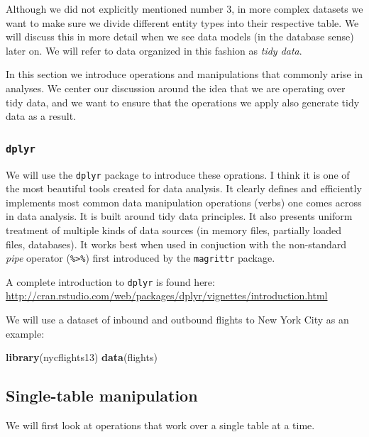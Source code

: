 \documentclass[]{article}
\newenvironment{Shaded}{\begin{snugshade}}{\end{snugshade}}
\newcommand{\KeywordTok}[1]{\textcolor[rgb]{0.13,0.29,0.53}{\textbf{{#1}}}}
\newcommand{\NormalTok}[1]{{#1}}
\theoremstyle{definition}
\theoremstyle{definition}
\theoremstyle{remark}
\begin{document}
Although we did not explicitly mentioned number 3, in more complex
datasets we want to make sure we divide different entity types into
their respective table. We will discuss this in more detail when we see
data models (in the database sense) later on. We will refer to data
organized in this fashion as \emph{tidy data}.

In this section we introduce operations and manipulations that commonly
arise in analyses. We center our discussion around the idea that we are
operating over tidy data, and we want to ensure that the operations we
apply also generate tidy data as a result.

\subsubsection{\texorpdfstring{\texttt{dplyr}}{dplyr}}\label{dplyr}

We will use the \texttt{dplyr} package to introduce these oprations. I
think it is one of the most beautiful tools created for data analysis.
It clearly defines and efficiently implements most common data
manipulation operations (verbs) one comes across in data analysis. It is
built around tidy data principles. It also presents uniform treatment of
multiple kinds of data sources (in memory files, partially loaded files,
databases). It works best when used in conjuction with the non-standard
\emph{pipe} operator (\texttt{\%\textgreater{}\%}) first introduced by
the \texttt{magrittr} package.

A complete introduction to \texttt{dplyr} is found here:
\href{http://cran.rstudio.com/web/packages/dplyr/vignettes/introduction.html}{\url{http://cran.rstudio.com/web/packages/dplyr/vignettes/introduction.html}}

We will use a dataset of inbound and outbound flights to New York City
as an example:

\begin{Shaded}
\begin{Highlighting}[]
\KeywordTok{library}\NormalTok{(nycflights13)}
\KeywordTok{data}\NormalTok{(flights)}
\end{Highlighting}
\end{Shaded}

\subsection{Single-table manipulation}\label{single-table-manipulation}

We will first look at operations that work over a single table at a
time.
\end{document}

